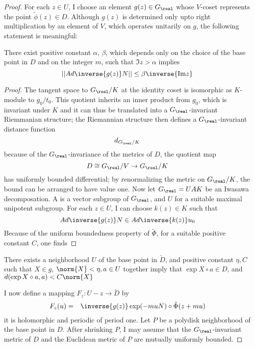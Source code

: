 \documentclass{article}
\begin{document}
\begin{proof}
For each $z \in U$, I choose an element $g(z) \in G_{\real}$ whose $V$-coset represents
the point $\tilde{\phi}(z)\in D$. Although $g(z)$ is determined only upto right
multiplication by an element of $V$, which operates unitarily on $g$, the following 
statement is meaningful:
\begin{lemma}
There exist positive constant $\alpha$, $\beta$, which depends only on the choice
of the base point in $D$ and on the integer $m$, such that $\Im z > \alpha$ implies
\[
    ||Ad\inverse{g(z)}N|| \le \beta\inverse{\Im z}
\]
\end{lemma}
\begin{proof}
The tangent space to $G_{\real}/K$ at the identity coset is isomorphic as $K$-module
to $g_0/t_0$. This quotient inherits an inner product from $g_0$, which is invariant
under $K$ and it can thus be translated into a $G_{\real}$-invariant Riemmanian structure;
the Riemannian structure then defines a $G_{\real}$-invariant distance function 
\[
    d_{G_{\real}/K}
\]
because of the $G_{\real}$-invariance of the metrics of $D$, the quotient map
\[
    D \cong G_{\real}/V \rightarrow G_{\real}/K
\]
has uniformly bounded differential; by renormalizing the metric on $G_{\real}/K$, the
bound can be arranged to have value one. Now let $G_{\real}=UAK$ be an Iwasawa decomposation.
A is a vector subgroup of $G_{\real}$, and $U$ for a suitable maximal unipotent subgroup.
For each $z\in U$, I can choose $k(z)\in K$ such that
\[
    Ad\inverse{g(z)}N \in Ad\inverse{k(z)}u_0
\]
Because of the uniform boundedness property of $\tilde{\Phi}$, for a suitable positive
constant $C$, one finds
\end{proof}

\begin{lemma}
There exists a neighborhood $U$ of the base point in $\check{D}$, and positive constant
$\eta, C$ such that $X\in g$, $\norm{X} < \eta, a \in U$ together imply that
$\exp{X}\circ a \in D$, and $d(\exp{X}\circ a, a) < C\norm{X}$
\end{lemma}

I now define a mapping $F_z: U - z \rightarrow \check{D}$ by
\begin{align*}
    F_z(u) & = & \inverse{g(z)}\exp(-muN)\circ\tilde{\Phi}(z + mu) \\
\end{align*}
it is holomorphic and periodic of period one. Let $P$ be a polydisk neighborhood of 
the base point in $D$. After shrinking $P$, I may assume that the $G_{\real}$-invariant
metric of $D$ and the Euclidean metric of $P$ are mutually uniformly bounded. 


\end{proof}
\end{document}
